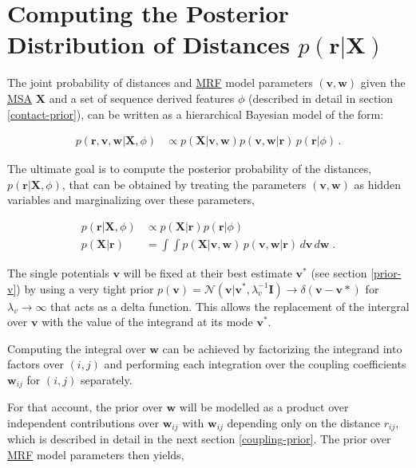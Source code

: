 \documentclass[12pt,a4paper,twoside]{book}
\newcommand{\Gauss}{\mathcal{N}}
\newcommand{\I}{\mathbf{I}}
\renewcommand{\r}{\mathbf{r}}
\newcommand{\rij}{r_{ij}}
\renewcommand{\v}{\mathbf{v}}
\newcommand{\w}{\mathbf{w}}
\newcommand{\wij}{\mathbf{w}_{ij}}
\newcommand{\X}{\mathbf{X}}
\theoremstyle{definition}
\theoremstyle{definition}
\theoremstyle{remark}
\begin{document}
\section{\texorpdfstring{Computing the Posterior Distribution of
Distances
\(p(\r | \X)\)}{Computing the Posterior Distribution of Distances p(\textbackslash{}r \textbar{} \textbackslash{}X)}}\label{overview-posterior-distances}

The joint probability of distances and \protect\hyperlink{abbrev}{MRF}
model parameters \((\v, \w)\) given the \protect\hyperlink{abbrev}{MSA}
\(\X\) and a set of sequence derived features \(\phi\) (described in
detail in section \ref{contact-prior}), can be written as a hierarchical
Bayesian model of the form:

\begin{align}
        p(\r, \v, \w | \X, \phi) &\propto p(\X | \v, \w) p(\v, \w | \r) \, p(\r | \phi ) \, .
\label{eq:hierarchical-bayesian-model}
\end{align}

The ultimate goal is to compute the posterior probability of the
distances, \(p(\r | \X, \phi)\), that can be obtained by treating the
parameters \((\v, \w)\) as hidden variables and marginalizing over these
parameters,

\begin{align}
    p(\r | \X , \phi) &\propto  p(\X | \r) p(\r | \phi)\\
    p(\X | \r) &= \int \int p(\X | \v,\w) \, p(\v, \w | \r) \,d\v\,d\w  \; .
\label{eq:integrate-out-vw}
\end{align}

The single potentials \(\v\) will be fixed at their best estimate
\(\v^*\) (see section \ref{prior-v}) by using a very tight prior
\(p(\v) = \Gauss(\v|\v^*,\lambda_v^{-1} \I) \rightarrow \delta(\v-\v*)\)
for \(\lambda_v \rightarrow \infty\) that acts as a delta function. This
allows the replacement of the intergral over \(\v\) with the value of
the integrand at its mode \(\v^*\).

Computing the integral over \(\w\) can be achieved by factorizing the
integrand into factors over \((i,j)\) and performing each integration
over the coupling coefficients \(\wij\) for \((i,j)\) separately.

For that account, the prior over \(\w\) will be modelled as a product
over independent contributions over \(\wij\) with \(\wij\) depending
only on the distance \(\rij\), which is described in detail in the next
section \ref{coupling-prior}. The prior over
\protect\hyperlink{abbrev}{MRF} model parameters then yields,
\end{document}
